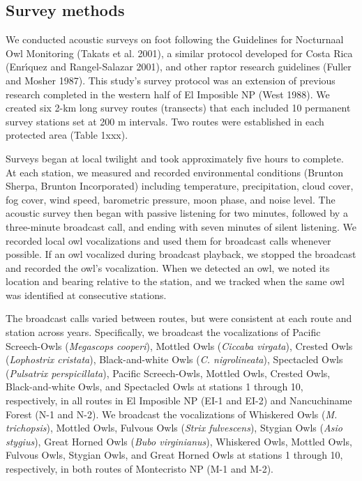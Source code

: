 \documentclass[
]{article}
\begin{document}
\hypertarget{survey-methods}{%
\subsection{Survey methods}\label{survey-methods}}

We conducted acoustic surveys on foot following the Guidelines for
Nocturnaal Owl Monitoring (Takats et al. 2001), a similar protocol
developed for Costa Rica (Enrı́quez and Rangel-Salazar 2001), and other
raptor research guidelines (Fuller and Mosher 1987). This study's survey
protocol was an extension of previous research completed in the western
half of El Imposible NP (West 1988). We created six 2-km long survey
routes (transects) that each included 10 permanent survey stations set
at 200 m intervals. Two routes were established in each protected area
(Table 1xxx).

Surveys began at local twilight and took approximately five hours to
complete. At each station, we measured and recorded environmental
conditions (Brunton Sherpa, Brunton Incorporated) including temperature,
precipitation, cloud cover, fog cover, wind speed, barometric pressure,
moon phase, and noise level. The acoustic survey then began with passive
listening for two minutes, followed by a three-minute broadcast call,
and ending with seven minutes of silent listening. We recorded local owl
vocalizations and used them for broadcast calls whenever possible. If an
owl vocalized during broadcast playback, we stopped the broadcast and
recorded the owl's vocalization. When we detected an owl, we noted its
location and bearing relative to the station, and we tracked when the
same owl was identified at consecutive stations.

The broadcast calls varied between routes, but were consistent at each
route and station across years. Specifically, we broadcast the
vocalizations of Pacific Screech-Owls (\emph{Megascops cooperi}),
Mottled Owls (\emph{Ciccaba virgata}), Crested Owls (\emph{Lophostrix
cristata}), Black-and-white Owls (\emph{C. nigrolineata}), Spectacled
Owls (\emph{Pulsatrix perspicillata}), Pacific Screech-Owls, Mottled
Owls, Crested Owls, Black-and-white Owls, and Spectacled Owls at
stations 1 through 10, respectively, in all routes in El Imposible NP
(EI-1 and EI-2) and Nancuchiname Forest (N-1 and N-2). We broadcast the
vocalizations of Whiskered Owls (\emph{M. trichopsis}), Mottled Owls,
Fulvous Owls (\emph{Strix fulvescens}), Stygian Owls (\emph{Asio
stygius}), Great Horned Owls (\emph{Bubo virginianus}), Whiskered Owls,
Mottled Owls, Fulvous Owls, Stygian Owls, and Great Horned Owls at
stations 1 through 10, respectively, in both routes of Montecristo NP
(M-1 and M-2).
\end{document}
